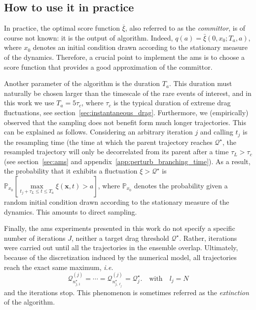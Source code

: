 \documentclass{jfm}
\begin{document}
\subsection{How to use it in practice}
In practice, the optimal score function $\overline{\xi}$, also referred to as the \emph{committor}, is of course not known: it is the output of algorithm.
Indeed, $q(a) = \bar{\xi}(0, x_0;T_a,a)$, where $x_0$ denotes an initial condition drawn according to the stationary measure of the dynamics.
Therefore, a crucial point to implement the \ac{ams} is to choose a score function that provides a good approximation of the committor.

Another parameter of the algorithm is the duration $T_a$.
This duration must naturally be chosen larger than the timescale of the rare events of interest, and in this work we use $T_a = 5\tau_c$, where $\tau_c$ is the typical duration of extreme drag fluctuations, see section~\ref{sec:instantaneous_drag}.
Furthermore, we (empirically) observed that the sampling does not benefit form much longer trajectories.
This can be explained as follows.
Considering an arbitrary iteration $j$ and calling $t_j$ is the resampling time (the time at which the parent trajectory reaches $\mathcal{Q}^{\star}$, the resampled trajectory will only be decorrelated from its parent
after a time $\tau_L > \tau_c$ (see section~\ref{sec:ams} and appendix~\ref{app:perturb_branching_time}).
As a result, the probability that it exhibits a fluctuation $\xi > \mathcal{Q}^{\star}$ is $\mathbb{P}_{x_0}[\underset{t_j+\tau_L \le t \le T_a}\max \xi(\mathbf{x},t) > a]$, where $\mathbb{P}_{x_0}$ denotes the probability given a random initial condition drawn according to the stationary measure of the dynamics.
This amounts to direct sampling.

Finally, the \ac{ams} experiments presented in this work do not specify a specific number of iterations $J$, neither a target drag threshold $\mathcal{Q}^{\star}$.
Rather, iterations were carried out until all the trajectories in the ensemble overlap.
Ultimately, because of the discretization induced by the numerical model, all trajectories reach the exact same maximum, \textit{i.e.}
\begin{equation}
\mathcal{Q}_{n_{j,1}^\star}^{(j)} = \cdots = \mathcal{Q}_{n_{j,\ell_j}^\star}^{(j)} = \mathcal{Q}_j^\star. \quad \text{with} \quad l_j = N
\end{equation}
and the iterations stop.
This phenomenon is sometimes referred as the \textit{extinction} of the algorithm.
\end{document}
